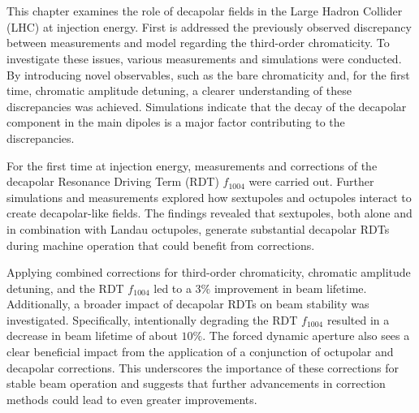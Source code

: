 
\section{}
This chapter examines the role of decapolar fields in the Large Hadron Collider (LHC) at injection
energy. First is addressed the previously observed discrepancy between measurements and model
regarding the third-order chromaticity. To investigate these issues, various measurements and
simulations were conducted. By introducing novel observables, such as the bare chromaticity and, for the
first time, chromatic amplitude detuning, a clearer understanding of these discrepancies was
achieved. Simulations indicate that the decay of the decapolar component in the main dipoles is a
major factor contributing to the discrepancies.

For the first time at injection energy, measurements and corrections of the decapolar Resonance
Driving Term (RDT) $f_{1004}$ were carried out. Further simulations and measurements explored how
sextupoles and octupoles interact to create decapolar-like fields. The findings revealed that
sextupoles, both alone and in combination with Landau octupoles, generate substantial decapolar RDTs
during machine operation that could benefit from corrections.

Applying combined corrections for third-order chromaticity, chromatic amplitude detuning, and the
RDT $f_{1004}$ led to a $3\%$ improvement in beam lifetime. Additionally, a broader impact of
decapolar RDTs on beam stability was investigated. Specifically, intentionally degrading the RDT
$f_{1004}$ resulted in a decrease in beam lifetime of about $10\%$. The forced dynamic aperture also
sees a clear beneficial impact from the application of a conjunction of octupolar and decapolar
corrections. 
This underscores the importance of these corrections for stable beam operation and suggests that
further advancements in correction methods could lead to even greater improvements. 